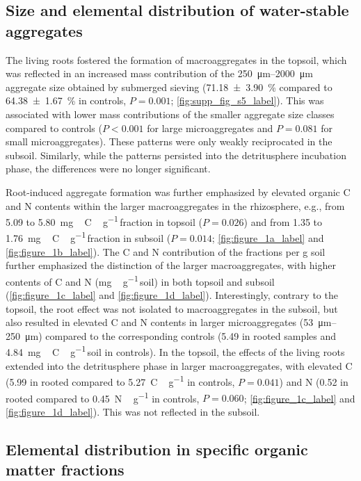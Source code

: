 \subsection{Size and elemental distribution of water-stable aggregates}

The living roots fostered the formation of macroaggregates in the topsoil, which was reflected in an increased mass contribution of the \SIrange{250}{2000}{\micro\metre} aggregate size obtained by submerged sieving (\SI{71.18 \pm 3.90}{\percent} compared to \SI{64.38 \pm 1.67}{\percent} in controls, \(P=0.001\); \cref{fig:supp_fig_s5_label}). This was associated with lower mass contributions of the smaller aggregate size classes compared to controls (\(P < 0.001\) for large microaggregates and \(P=0.081\) for small microaggregates). These patterns were only weakly reciprocated in the subsoil. Similarly, while the patterns persisted into the detritusphere incubation phase, the differences were no longer significant.

Root-induced aggregate formation was further emphasized by elevated organic C and N contents within the larger macroaggregates in the rhizosphere, e.g., from \num{5.09} to \SI{5.80}{mg\,C\,\gram^{-1}}\,fraction in topsoil (\(P=0.026\)) and from \num{1.35} to \SI{1.76}{mg\,C\,\gram^{-1}}\,fraction in subsoil (\(P=0.014\); \cref{fig:figure_1a_label} and \cref{fig:figure_1b_label}). The C and N contribution of the fractions per g soil further emphasized the distinction of the larger macroaggregates, with higher contents of C and N (\si{mg\,\gram^{-1}}\,soil) in both topsoil and subsoil (\cref{fig:figure_1c_label} and \cref{fig:figure_1d_label}). Interestingly, contrary to the topsoil, the root effect was not isolated to macroaggregates in the subsoil, but also resulted in elevated C and N contents in larger microaggregates (\SIrange{53}{250}{\micro\metre}) compared to the corresponding controls (\num{5.49} in rooted samples and \SI{4.84}{mg\,C\,\gram^{-1}}\,soil in controls). In the topsoil, the effects of the living roots extended into the detritusphere phase in larger macroaggregates, with elevated C (\num{5.99} in rooted compared to \SI{5.27}{C\,\gram^{-1}} in controls, \(P=0.041\)) and N (\num{0.52} in rooted compared to \SI{0.45}{N\,\gram^{-1}} in controls, \(P=0.060\); \cref{fig:figure_1c_label} and \cref{fig:figure_1d_label}). 
This was not reflected in the subsoil.

\subsection{Elemental distribution in specific organic matter fractions}

